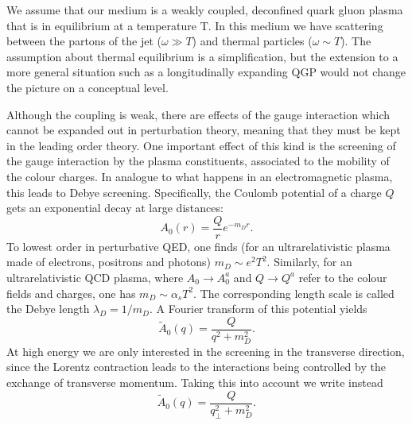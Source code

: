 \documentclass[a4paper,12pt]{article}
\numberwithin{equation}{section}
\begin{document}
We assume that our medium is a weakly coupled, deconfined quark gluon plasma that is in equilibrium at a temperature T. In this medium we have scattering between the partons of the jet ($\omega \gg T$) and thermal particles ($\omega \sim T$). The assumption about thermal equilibrium is a simplification, but the extension to a more general situation such as a longitudinally expanding QGP would not change the picture on a conceptual level.


Although the coupling is weak, there are effects of the gauge interaction which cannot be expanded out in perturbation theory, meaning that they must be kept in the leading order theory. One important effect of this kind is the screening of the gauge interaction by the plasma constituents, associated to the mobility of the colour charges. In analogue to what happens in an electromagnetic plasma, this leads to Debye screening. Specifically, the Coulomb potential of a charge $Q$ gets an exponential decay at large distances:
\begin{equation}
A_0(r)=\frac{Q}{r}e^{-m_Dr}.
\end{equation}
To lowest order in perturbative QED, one finds (for an ultrarelativistic plasma made of electrons, positrons and photons) $m_D\sim e^2 T^2$. Similarly, for an ultrarelativistic QCD plasma, where $A_0\rightarrow A_0^a$ and $Q\rightarrow Q^a$ refer to the colour fields and charges, one has $m_D\sim \alpha_s T^2$\cite{Debye}. The corresponding length scale is called the Debye length $\lambda_D=1/m_D$.
A Fourier transform of this potential yields
\begin{equation}
\tilde{A}_0(q)=\frac{Q}{q^2+m_D^2}.
\end{equation}
At high energy we are only interested in the screening in the transverse direction, since the Lorentz contraction leads to the interactions being controlled by the exchange of transverse momentum. Taking this into account we write instead 
\begin{equation}\label{Debye}
\tilde{A}_0(q)=\frac{Q}{q_\perp^2+m_D^2}.
\end{equation}
\end{document}
